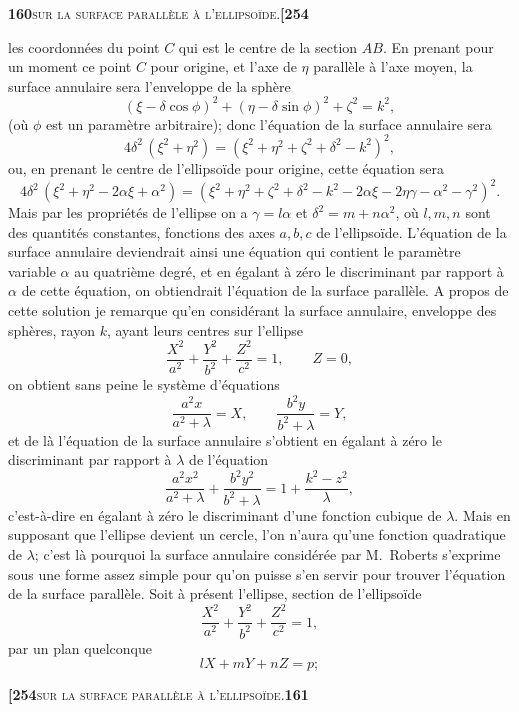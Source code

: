 \documentclass[11pt]{article}
\begin{document}
\newpage

\noindent\textbf{160}\hfill\textsc{sur la surface parallèle à l'ellipsoïde.}\hfill\textbf{[254}

\medskip

\noindent les coordonnées du point $C$ qui est le centre de la section $AB$. En prenant pour un moment ce point $C$ pour origine, et l'axe de $\eta$ parallèle à l'axe moyen, la surface annulaire sera l'enveloppe de la sphère
\[
(\xi - \delta\cos\phi)^2 + (\eta - \delta\sin\phi)^2 + \zeta^2 = k^2,
\]
(où $\phi$ est un paramètre arbitraire); donc l'équation de la surface annulaire sera
\[
4\delta^2\,(\xi^2 + \eta^2) = (\xi^2 + \eta^2 + \zeta^2 + \delta^2 - k^2)^2,
\]
ou, en prenant le centre de l'ellipsoïde pour origine, cette équation sera
\[
4\delta^2\,(\xi^2 + \eta^2 - 2\alpha\xi + \alpha^2) = (\xi^2 + \eta^2 + \zeta^2 + \delta^2 - k^2 - 2\alpha\xi - 2\eta\gamma - \alpha^2 - \gamma^2)^2.
\]
Mais par les propriétés de l'ellipse on a $\gamma = l\alpha$ et $\delta^2 = m + n\alpha^2$, où $l, m, n$ sont des quantités constantes, fonctions des axes $a, b, c$ de l'ellipsoïde. L'équation de la surface annulaire deviendrait ainsi une équation qui contient le paramètre variable $\alpha$ au quatrième degré, et en égalant à zéro le discriminant par rapport à $\alpha$ de cette équation, on obtiendrait l'équation de la surface parallèle. A propos de cette solution je remarque qu'en considérant la surface annulaire, enveloppe des sphères, rayon $k$, ayant leurs centres sur l'ellipse
\[
\frac{X^2}{a^2} + \frac{Y^2}{b^2} + \frac{Z^2}{c^2} = 1,\qquad Z = 0,
\]
on obtient sans peine le système d'équations
\[
\frac{a^2x}{a^2 + \lambda} = X,\qquad \frac{b^2y}{b^2 + \lambda} = Y,
\]
et de là l'équation de la surface annulaire s'obtient en égalant à zéro le discriminant par rapport à $\lambda$ de l'équation
\[
\frac{a^2x^2}{a^2 + \lambda} + \frac{b^2y^2}{b^2 + \lambda} = 1 + \frac{k^2 - z^2}{\lambda},
\]
c'est-à-dire en égalant à zéro le discriminant d'une fonction cubique de $\lambda$. Mais en supposant que l'ellipse devient un cercle, l'on n'aura qu'une fonction quadratique de $\lambda$; c'est là pourquoi la surface annulaire considérée par M.~Roberts s'exprime sous une forme assez simple pour qu'on puisse s'en servir pour trouver l'équation de la surface parallèle. Soit à présent l'ellipse, section de l'ellipsoïde
\[
\frac{X^2}{a^2} + \frac{Y^2}{b^2} + \frac{Z^2}{c^2} = 1,
\]
par un plan quelconque
\[
lX + mY + nZ = p;
\]

\newpage

\noindent\textbf{[254}\hfill\textsc{sur la surface parallèle à l'ellipsoïde.}\hfill\textbf{161}
\end{document}
